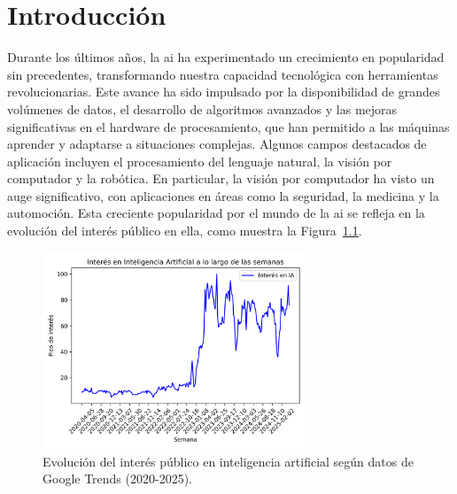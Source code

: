 \documentclass[11pt,spanish,listoffigures,listoftables]{tfgetsinf}
\begin{document}

\mainmatter


\chapter{Introducci\'on}\label{chap:introduccion}
Durante los últimos años, la \gls{ai} ha experimentado un crecimiento en popularidad sin precedentes, transformando nuestra capacidad tecnológica con herramientas revolucionarias. Este avance ha sido impulsado por la disponibilidad de grandes volúmenes de datos, el desarrollo de algoritmos avanzados y las mejoras significativas en el hardware de procesamiento, que han permitido a las máquinas aprender y adaptarse a situaciones complejas. Algunos campos destacados de aplicación incluyen el procesamiento del lenguaje natural, la visión por computador y la robótica. En particular, la visión por computador ha visto un auge significativo, con aplicaciones en áreas como la seguridad, la medicina y la automoción. Esta creciente popularidad por el mundo de la \gls{ai} se refleja en la evolución del interés público en ella, como muestra la Figura~\ref{fig:interes_en_inteligencia_artificial}.

\begin{figure}[H]
   \centering
   \includegraphics[width=0.7\textwidth]{excels/introduccion/interes_en_ia.png}
   \caption[Evolución del interés público en inteligencia artificial según datos de Google Trends (2020-2025)]{Evolución del interés público en inteligencia artificial según datos de Google Trends (2020-2025).}
\label{fig:interes_en_inteligencia_artificial}
\end{figure}
\end{document}
